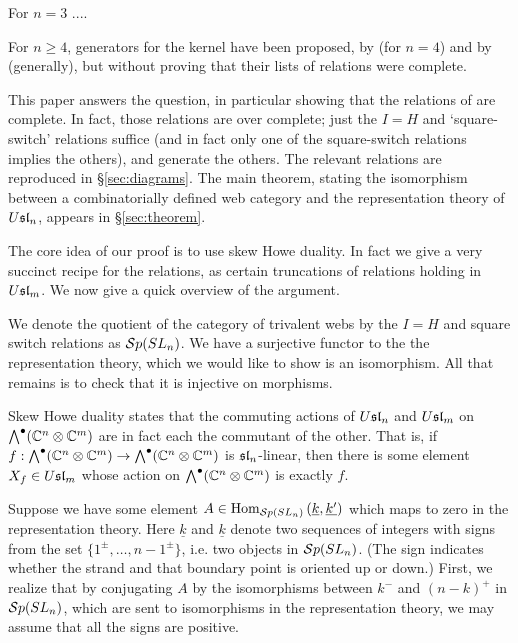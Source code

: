 \documentclass[10pt,leqno]{article}
\begin{document}
For $n=3$ .... 

For $n \geq 4$, generators for the kernel have been proposed, by \cite{math.QA/0310143} (for $n=4$) and by \cite{0704.1503} (generally), but without proving that their lists of relations were complete.

This paper answers the question, in particular showing that the relations of \cite{0704.1503} are complete. In fact, those relations are over complete; just the $I=H$ and `square-switch' relations suffice (and in fact only one of the square-switch relations implies the others), and generate the others. The relevant relations are reproduced in \S\ref{sec:diagrams}.
The main theorem, stating the isomorphism between a combinatorially defined web category and the representation theory of $\Usl{n}$, appears in \S \ref{sec:theorem}.

The core idea of our proof is to use skew Howe duality. In fact we give a very succinct recipe for the relations, as certain truncations of relations holding in $\Usl{m}$. We now give a quick overview of the argument.

We denote the quotient of the category of trivalent webs by the $I=H$ and square switch relations as $\Sp(SL_n)$. We have a surjective functor to the the representation theory, which we would like to show is an isomorphism. All that remains is to check that it is injective on morphisms.

Skew Howe duality states that the commuting actions of $\Usl{n}$ and $\Usl{m}$ on $\Alt^\bullet(\mathbb{C}^n \tensor \mathbb{C}^m)$ are in fact each the commutant of the other. That is, if  $f: \Alt^\bullet(\mathbb{C}^n \tensor \mathbb{C}^m) \to \Alt^\bullet(\mathbb{C}^n \tensor \mathbb{C}^m)$ is $\sl_n$-linear, then there is some element $X_f \in \Usl{m}$ whose action on  $\Alt^\bullet(\mathbb{C}^n \tensor \mathbb{C}^m)$ is exactly $f$.

Suppose we have some element $A \in \Homa{\Sp(SL_n)}{\underline{k}}{\underline{k'}}$ which maps to zero in the representation theory. Here $\underline{k}$ and $\underline{k}$ denote two sequences of integers with signs from the set $\{1^\pm,\ldots,n-1^\pm\}$, i.e. two objects in $\Sp(SL_n)$. (The sign indicates whether the strand and that boundary point is oriented up or down.) First, we realize that by conjugating $A$ by the isomorphisms between $k^-$ and $(n-k)^+$ in $\Sp(SL_n)$, which are sent to isomorphisms in the representation theory, we may assume that all the signs are positive.
\end{document}
